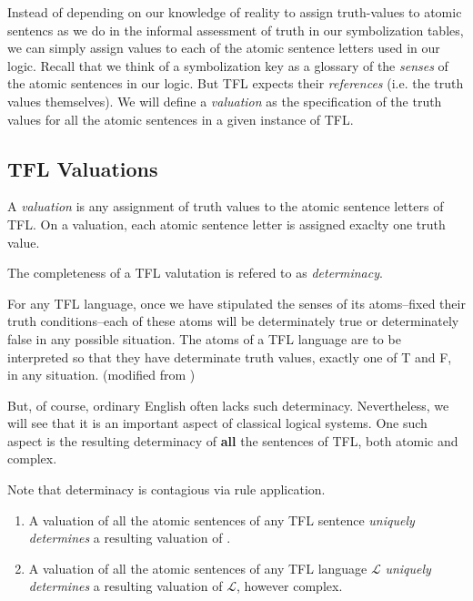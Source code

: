 Instead of depending on our knowledge of reality to assign truth-values to
atomic sentencs as we do in the informal assessment of truth in our
symbolization tables, we can simply assign values to each of the atomic
sentence letters used in our logic. Recall that we think of a symbolization
key as a glossary of the \emph{senses} of the atomic sentences in our logic. But
TFL expects their \emph{references} (i.e. the truth values themselves). We will
define a \emph{valuation} as the specification of the truth values for all the
atomic sentences in a given instance of TFL.

\subsection{TFL Valuations}

\begin{definition}[Valuation]
  \label{def:valuation}
  A \emph{valuation} is any assignment of truth values to the atomic sentence
  letters of TFL. On a valuation, each atomic sentence letter is assigned
  exaclty one truth value.
\end{definition}

The completeness of a TFL valutation is refered to as \emph{determinacy}.

\begin{definition}[Determinacy]
  For any TFL language, once we have stipulated the senses of its atoms--fixed
  their truth conditions--each of these atoms will be determinately true or
  determinately false in any possible situation. The atoms of a TFL language
  are to be interpreted so that they have determinate truth values, exactly
  one of T and F, in any situation. (modified from \cite[][p. 84-5]{Smi20})
\end{definition}

But, of course, ordinary English often lacks such determinacy. Nevertheless,
we will see that it is an important aspect of classical logical systems. One
such aspect is the resulting determinacy of \textbf{all} the sentences of TFL,
both atomic and complex.

\begin{observation}
  \label{obs:unique-determinacy}
  Note that determinacy is contagious via rule application.
  
  \begin{enumerate}
  \item A valuation of all the atomic sentences of any TFL sentence \sphi
    \emph{uniquely determines} a resulting valuation of \ephi.
  \item A valuation of all the atomic sentences of any TFL language
    $\mathcal{L}$ \emph{uniquely determines} a resulting valuation of
    $\mathcal{L}$, however complex.
  \end{enumerate}
  
\end{observation}

